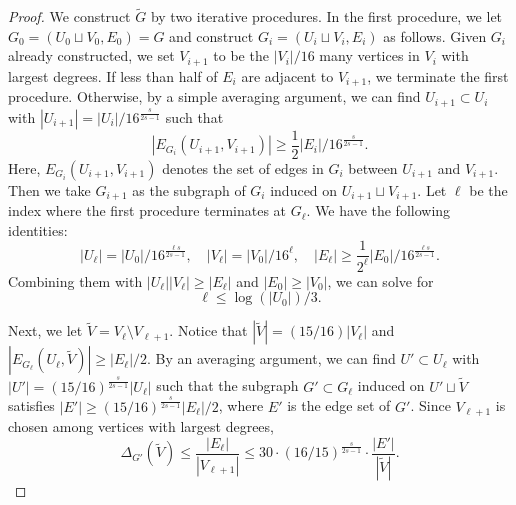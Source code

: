 \documentclass[11pt]{article}
\theoremstyle{definition}
\begin{document}
\begin{proof}
    We construct $\tilde{G}$ by two iterative procedures. In the first procedure, we let $G_0 = (U_0\sqcup V_0, E_0) = G$ and construct $G_i = (U_i\sqcup V_i, E_i)$ as follows. Given $G_i$ already constructed, we set $V_{i+1}$ to be the $|V_i|/16$ many vertices in $V_i$ with largest degrees. If less than half of $E_i$ are adjacent to $V_{i+1}$, we terminate the first procedure. Otherwise, by a simple averaging argument, we can find $U_{i+1} \subset U_i$ with $|U_{i+1}| = |U_i|/16^{\frac{s}{2s-1}}$ such that \begin{equation*}
        |E_{G_i}(U_{i+1}, V_{i+1})| \geq \frac{1}{2}|E_i|/16^{\frac{s}{2s-1}}.
    \end{equation*} Here, $E_{G_i}(U_{i+1}, V_{i+1})$ denotes the set of edges in $G_i$ between $U_{i+1}$ and $V_{i+1}$. Then we take $G_{i+1}$ as the subgraph of $G_i$ induced on $U_{i+1} \sqcup V_{i+1}$. Let $\ell$ be the index where the first procedure terminates at $G_{\ell}$. We have the following identities:\begin{equation*}
        |U_{\ell}| = |U_0|/16^{\frac{\ell s}{2s-1}},\quad |V_\ell| = |V_0|/16^\ell,\quad |E_\ell| \geq \frac{1}{2^\ell}|E_0|/16^{\frac{\ell s}{2s-1}}.
    \end{equation*} Combining them with $|U_\ell||V_\ell|\geq|E_\ell|$ and $|E_0| \geq |V_0|$, we can solve for \begin{equation}\label{eq:biregular_ell}
        \ell \leq \log(|U_0|)/3.
    \end{equation}

    Next, we let $\tilde{V} = V_\ell \setminus V_{\ell+1}$. Notice that $|\tilde{V}| = (15/16)|V_\ell|$ and $|E_{G_\ell}(U_\ell, \tilde{V})| \geq |E_\ell|/2$. By an averaging argument, we can find $U' \subset U_\ell$ with $|U'| = (15/16)^{\frac{s}{2s-1}}|U_\ell|$ such that the subgraph $G'\subset G_\ell$ induced on $U' \sqcup \tilde{V}$ satisfies $|E'| \geq (15/16)^{\frac{s}{2s-1}}|E_\ell|/2$, where $E'$ is the edge set of $G'$. Since $V_{\ell+1}$ is chosen among vertices with largest degrees, \begin{equation}\label{eq:biregular_B}
        \Delta_{G'}(\tilde{V}) \leq \frac{|E_{\ell}|}{|V_{\ell+1}|} \leq 30 \cdot (16/15)^{\frac{s}{2s-1}} \cdot \frac{|E'|}{|\tilde{V}|}.
    \end{equation}
    

\end{proof}
\end{document}
